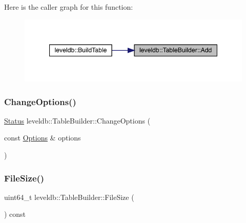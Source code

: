 Here is the caller graph for this function\+:
\nopagebreak
\begin{figure}[H]
\begin{center}
\leavevmode
\includegraphics[width=347pt]{classleveldb_1_1_table_builder_a37bd347cb6340215475ac9b42dc19d10_icgraph}
\end{center}
\end{figure}
\mbox{\label{classleveldb_1_1_table_builder_a6e37a5ddc82161e8665f2fba08031c24}} 
\subsubsection{\texorpdfstring{ChangeOptions()}{ChangeOptions()}}
{\footnotesize\ttfamily \mbox{\hyperlink{classleveldb_1_1_status}{Status}} leveldb\+::\+Table\+Builder\+::\+Change\+Options (\begin{DoxyParamCaption}\item[{const \mbox{\hyperlink{structleveldb_1_1_options}{Options}} \&}]{options }\end{DoxyParamCaption})}

\mbox{\label{classleveldb_1_1_table_builder_a50ac83aca1c3321f16f26748d654a6ae}} 
\subsubsection{\texorpdfstring{FileSize()}{FileSize()}}
{\footnotesize\ttfamily uint64\+\_\+t leveldb\+::\+Table\+Builder\+::\+File\+Size (\begin{DoxyParamCaption}{ }\end{DoxyParamCaption}) const}

